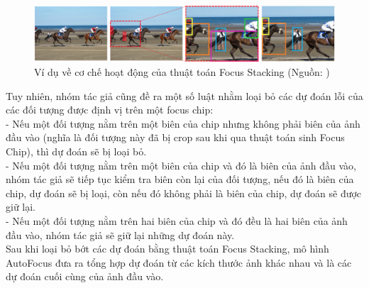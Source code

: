 {    \begin{figure}[H]
        \centering
        \includegraphics[width=12cm] {images/autofocus_focus_stack}
        \caption{Ví dụ về cơ chế hoạt động của thuật toán Focus Stacking (Nguồn: \cite{najibi2019autofocus})}
        \label{fig:autofocus_focus_stack}
    \end{figure}

    \noindent
    Tuy nhiên, nhóm tác giả cũng đề ra một số luật nhằm loại bỏ các dự đoán lỗi của các đối tượng được định vị trên một focus chip: \\
    - Nếu một đối tượng nằm trên một biên của chip nhưng không phải biên của ảnh đầu vào (nghĩa là đối tượng này đã bị crop sau khi qua thuật toán sinh Focus Chip), thì dự đoán sẽ bị loại bỏ. \\
    - Nếu một đối tượng nằm trên một biên của chip và đó là biên của ảnh đầu vào, nhóm tác giả sẽ tiếp tục kiểm tra biên còn lại của đối tượng, nếu đó là biên của chip, dự đoán sẽ bị loại, còn nếu đó không phải là biên của chip, dự đoán sẽ được giữ lại. \\
    - Nếu một đối tượng nằm trên hai biên của chip và đó đều là hai biên của ảnh đầu vào, nhóm tác giả sẽ giữ lại những dự đoán này. \\
    Sau khi loại bỏ bớt các dự đoán bằng thuật toán Focus Stacking, mô hình AutoFocus đưa ra tổng hợp dự đoán từ các kích thước ảnh khác nhau và là các dự đoán cuối cùng của ảnh đầu vào.
}